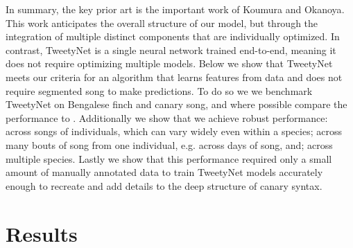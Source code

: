 \documentclass[10pt,letterpaper]{article}
\begin{document}
In summary, the key prior art is the important work of Koumura and Okanoya\cite{koumura_automatic_2016-1}. This work anticipates the overall structure of our model, but through the integration of multiple distinct components that are individually optimized.  In contrast, TweetyNet is a single neural network trained end-to-end, meaning it does not require optimizing multiple models. 
Below we show that TweetyNet meets our criteria for an algorithm that 
learns features from data and does not require segmented song to make predictions.
To do so we we benchmark TweetyNet on Bengalese finch and canary song, 
and where possible compare the performance to \cite{koumura_automatic_2016-1}. 
Additionally we show that we achieve robust performance:
across songs of individuals, which can vary widely even within a species; 
across many bouts of song from one individual, e.g. across days of song, and; 
across multiple species.
Lastly we show that this performance required only a small amount of 
manually annotated data to train TweetyNet models accurately enough to recreate and add details to the deep structure of canary syntax.

\section*{Results}
\label{Results}
\end{document}
